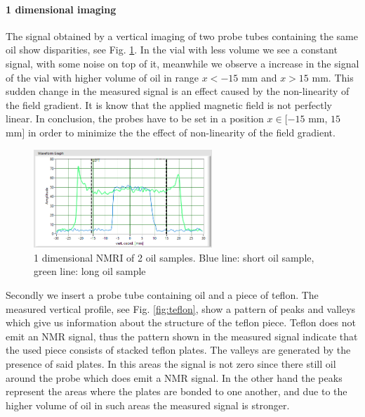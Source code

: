 \paragraph{1 dimensional imaging}
The signal obtained by a vertical imaging of two probe tubes containing the same oil show disparities, see Fig. \ref{fig: long and short oil}. In the vial with less volume we see a constant signal, with some noise on top of it, meanwhile we observe a increase in the signal of the vial with higher volume of oil in range $x < -15$ mm and $x > 15$ mm. This sudden change in the measured signal is an effect caused by the non-linearity of the field gradient. It is know that the applied magnetic field is not perfectly linear. In conclusion, the probes have to be set in a position $x \in [-15$ mm, $15$ mm$]$ in order to minimize the the effect of non-linearity of the field gradient. 
\begin{figure}[!htbp]
  \begin{center}
    \includegraphics[width= 0.6\textwidth]{./Protocol images/III/long&short_signal.png}
 \caption{1 dimensional NMRI of 2 oil samples. Blue line: short oil sample, green line: long oil sample}
    \label{fig: long and short oil}
   \end{center}
 \end{figure} 
 
Secondly we insert a probe tube containing oil and a piece of teflon. The measured vertical profile, see Fig. \ref{fig:teflon}, show a pattern of peaks and valleys which give us information about the structure of the teflon piece. Teflon does not emit an NMR signal, thus the pattern shown in the measured signal indicate that the used piece consists of stacked teflon plates. The valleys are generated by the presence of said plates. In this areas the signal is not zero since there still oil around the probe which does emit a NMR signal. In the other hand the peaks represent the areas where the plates are bonded to one another, and due to the higher volume of oil in such areas the measured signal is stronger.  

